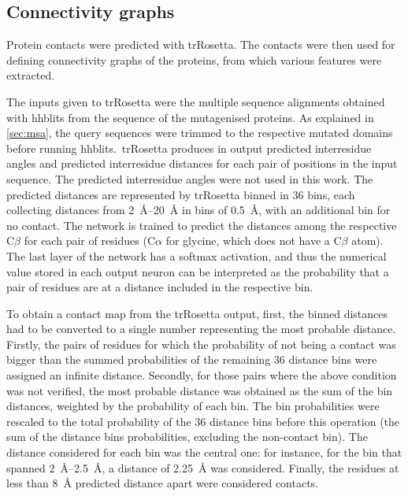 \subsection{Connectivity graphs}
Protein contacts were predicted with trRosetta.
The contacts were then used for defining connectivity graphs of the proteins, from which various features were extracted.

The inputs given to trRosetta were the multiple sequence alignments obtained with hhblits from the sequence of the mutagenised proteins.
As explained in \cref{sec:msa}, the query sequences were trimmed to the respective mutated domains before running hhblits.\
trRosetta produces in output predicted interresidue angles and predicted interresidue distances for each pair of positions in the input sequence.
The predicted interresidue angles were not used in this work.
The predicted distances are represented by trRosetta binned in 36 bins, each collecting distances from \SIrange{2}{20}{\angstrom} in bins of \SI{0.5}{\angstrom}, with an additional bin for no contact.
The network is trained to predict the distances among the respective C$\beta$ for each pair of residues (C$\alpha$ for glycine, which does not have a C$\beta$ atom).
The last layer of the network has a softmax activation, and thus the numerical value stored in each output neuron can be interpreted as the probability that a pair of residues are at a distance included in the respective bin.

To obtain a contact map from the trRosetta output, first, the binned distances had to be converted to a single number representing the most probable distance.
Firstly, the pairs of residues for which the probability of not being a contact was bigger than the summed probabilities of the remaining \num{36} distance bins were assigned an infinite distance.
Secondly, for those pairs where the above condition was not verified, the most probable distance was obtained as the sum of the bin distances, weighted by the probability of each bin.
The bin probabilities were rescaled to the total probability of the \num{36} distance bins before this operation (the sum of the distance bins probabilities, excluding the non-contact bin).
The distance considered for each bin was the central one: for instance, for the bin that spanned \SIrange{2}{2.5}{\angstrom}, a distance of \SI{2.25}{\angstrom} was considered.
Finally, the residues at less than \SI{8}{\angstrom} predicted distance apart were considered contacts.


